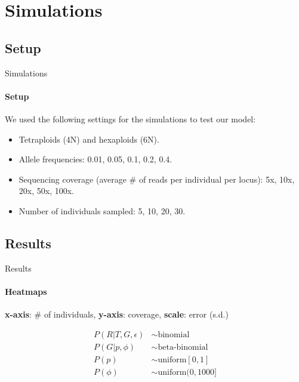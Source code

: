 \documentclass[presentation,serif]{beamer}
\begin{document}
\section{Simulations}

\subsection{Setup}

\begin{frame}[t]{Simulations}
	\framesubtitle{Setup}

	We used the following settings for the simulations to test our model:
	\vspace{0.1in}

	\begin{itemize}
		\item Tetraploids (4N) and hexaploids (6N).
		\item Allele frequencies: 0.01, 0.05, 0.1, 0.2, 0.4.
		\item Sequencing coverage (average \# of reads per individual per locus): 5x, 10x, 20x, 50x, 100x.
		\item Number of individuals sampled: 5, 10, 20, 30.
	\end{itemize}
\end{frame}

\subsection{Results}

\begin{frame}[c]{Results}
	\framesubtitle{Heatmaps}
	\textbf{x-axis}: \# of individuals, \textbf{y-axis}: coverage, \textbf{scale}: error (s.d.)
	\pause
	\begin{center}
	\end{center}
\end{frame}

\begin{frame}[c,plain]{}
	\begin{center}
	\end{center}
\end{frame}

\begin{frame}[c,plain]{}

	\begin{align*}
		P(R|T,G,\epsilon) &\sim \text{binomial} \\[0.075in]
		P(G|p,\phi) &\sim \text{beta-binomial} \\[0.075in]
		P(p) &\sim \text{uniform}[0,1] \\[0.075in]
		P(\phi) &\sim \text{uniform}(0,1000] \\[0.075in]
	\end{align*}

\end{frame}
\end{document}
